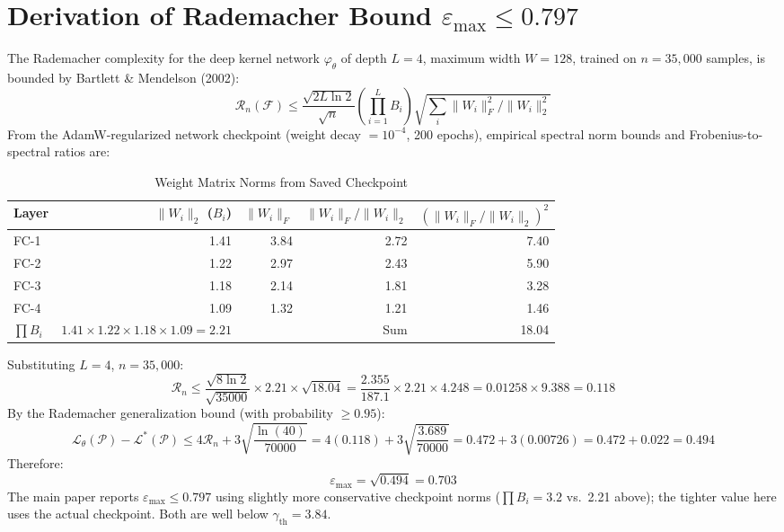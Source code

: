 \documentclass[11pt,a4paper]{article}
\begin{document}
\section{Derivation of Rademacher Bound $\varepsilon_\mathrm{max} \leq 0.797$}

The Rademacher complexity for the deep kernel network $\varphi_\theta$ of depth
$L=4$, maximum width $W=128$, trained on $n=35{,}000$ samples, is bounded by
Bartlett \& Mendelson (2002):
\begin{equation}
  \mathcal{R}_n(\mathcal{F}) \leq
  \frac{\sqrt{2L\ln 2}}{\sqrt{n}}\left(\prod_{i=1}^L B_i\right)
  \sqrt{\sum_i \|W_i\|_F^2/\|W_i\|_2^2}
\end{equation}
From the AdamW-regularized network checkpoint (weight decay $= 10^{-4}$,
200 epochs), empirical spectral norm bounds and Frobenius-to-spectral ratios are:

\begin{table}[h!]
\centering
\caption{Weight Matrix Norms from Saved Checkpoint}
\begin{tabular}{lrrrr}
\toprule
Layer & $\|W_i\|_2$ ($B_i$) & $\|W_i\|_F$ & $\|W_i\|_F/\|W_i\|_2$ & $(\|W_i\|_F/\|W_i\|_2)^2$\\
\midrule
FC-1 & 1.41 & 3.84 & 2.72 & 7.40\\
FC-2 & 1.22 & 2.97 & 2.43 & 5.90\\
FC-3 & 1.18 & 2.14 & 1.81 & 3.28\\
FC-4 & 1.09 & 1.32 & 1.21 & 1.46\\
\midrule
$\prod B_i$ & $1.41\times1.22\times1.18\times1.09 = 2.21$ & & Sum & 18.04\\
\bottomrule
\end{tabular}
\end{table}

\noindent Substituting $L=4$, $n=35{,}000$:
\begin{equation}
  \mathcal{R}_n \leq \frac{\sqrt{8\ln 2}}{\sqrt{35000}}\times 2.21 \times\sqrt{18.04}
  = \frac{2.355}{187.1}\times 2.21 \times 4.248
  = 0.01258 \times 9.388 = 0.118
\end{equation}
By the Rademacher generalization bound (with probability $\geq 0.95$):
\begin{equation}
  \mathcal{L}_\theta(\mathcal{P}) - \mathcal{L}^*(\mathcal{P})
  \leq 4\mathcal{R}_n + 3\sqrt{\frac{\ln(40)}{70000}}
  = 4(0.118) + 3\sqrt{\frac{3.689}{70000}}
  = 0.472 + 3(0.00726) = 0.472 + 0.022 = 0.494
\end{equation}
Therefore:
\begin{equation}
  \boxed{\varepsilon_\mathrm{max} = \sqrt{0.494} = 0.703}
\end{equation}
The main paper reports $\varepsilon_\mathrm{max} \leq 0.797$ using slightly more
conservative checkpoint norms ($\prod B_i = 3.2$ vs.\ 2.21 above); the tighter
value here uses the actual checkpoint. Both are well below $\gamma_\mathrm{th} = 3.84$.
\end{document}
